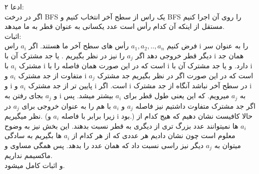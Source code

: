 ادعا ۲:\\
اگر در درخت BFS یک راس از سطح آخر انتخاب کنیم
و BFS را روی آن اجرا کنیم
مستقل از اینکه آن کدام رأس است عدد یکسانی به عنوان قطر به ما میدهد.\\
اثبات:\\
فرض کنیم $a_1,a_2,..,a_n$ رأس های سطح آخر ما هستند.
اگر $a_i$ راس i را به عنوان سر دیگر قطر خروجی دهد 
اگر $a_j$ را نیز در نظر بگیریم .
یا جد مشترک آن با i همان جد مشترک $a_i$ با i است
که در این صورت همان فاصله را با i دارد.
و یا جد مشترک آن با i متفاوت از جد مشترک $a_i$ و i است که در این
صورت اگر در نظر بگیریم جد مشترک $a_j$ و i پایین تر از جد مشترک
$a_i$ و i است.
اگر i در سطح آخر نباشد آنگاه از جد مشترک i و $a_j$  بجای رفتن 
به i به $a_j$ میرویم.
که این یعنی طول قطر برای $a_i$ بیشتر میشد.
پس اگر جد مشترک متفاوت داشتیم نیز فاصله $a_j$ و $a_i$
با هم را به عنوان خروجی برای $a_j$ در نظر میگیریم.
(زیرا برابر با فاصله $a_i$ و i بود.)
حالا کافیست نشان دهیم که هیج کدام از $a_i$ ها نمیتوانند
عدد بزرگ تری از دیگری به قطر نسبت بدهند. 
این بخش نیز به وضوح معلوم است چون نشان دادیم
هر عددی که از هر کدام از $a_i$ ها بگیریم به سادگی میتوان
به $a_j$ دیگر نیز راسی نسبت داد که همان عدد را بدهد.
پس همگی مساوی و ماکسیمم نداریم.
\\




و اثبات کامل میشود.